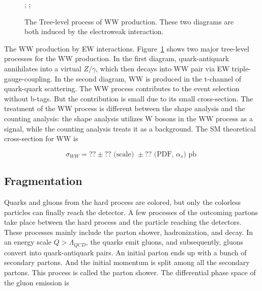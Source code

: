 \begin{figure}[ht]
    \centering
    ; \qquad
    ;
    \caption{The Tree-level process of WW production. These two diagrams are both induced by the electroweak interaction. }
    \label{fig:relatedWorks:ppCollision:ww}
\end{figure}

\noindent The WW production by EW interactions. Figure~\ref{fig:relatedWorks:ppCollision:ww} shows two major tree-level processes for the WW production. In the first diagram, quark-antiquark annihilates into a virtual $Z/\gamma$, which then decays into WW pair via EW triple-gauge-coupling. In the second diagram, WW is produced in the t-channel of quark-quark scattering. The WW process contributes to the event selection without b-tags. But the contribution is small due to its small cross-section. The treatment of the WW process is different between the shape analysis and the counting analysis: the shape analysis utilizes W bosons in the WW process as a signal, while the counting analysis treats it as a background. The SM theoretical cross-section for WW is 

\begin{equation}
    \sigma_{WW} = ?? \pm ??  \text{ (scale) }  \pm ??  \text{ (PDF, $\alpha_s$) pb }
\end{equation}


\subsection{Fragmentation}
\label{sec:relatedWorks:ppCollision:psJet} 

Quarks and gluons from the hard process are colored, but only the colorless particles can finally reach the detector. A few processes of the outcoming partons take place between the hard process and the particle reaching the detectors. These processes mainly include the parton shower, hadronization, and decay. In an energy scale $Q>\Lambda_{QCD}$, the quarks emit gluons, and subsequently, gluons convert into quark-antiquark pairs. An initial parton ends up with a bunch of secondary partons. And the initial momentum is split among all the secondary partons. This process is called the parton shower. The differential phase space of the gluon emission is


